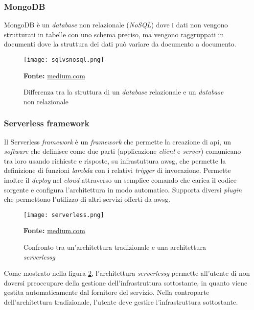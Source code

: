\subsubsection{MongoDB}
MongoDB è un \textit{database} non relazionale (\textit{NoSQL}) dove i dati non vengono strutturati in tabelle con uno schema preciso, ma vengono raggruppati in documenti dove la struttura dei dati può variare da documento a documento.  
\begin{figure}[H]
    \centering
    \texttt{[image: sqlvsnosql.png]}
    \caption{Differenza tra la struttura di un \textit{database} relazionale e un \textit{database} non relazionale}
    \small \textbf{Fonte:} \href{https://naveen-metta.medium.com/decoding-the-database-dilemma-sql-vs-nosql-in-system-design-876e21f4a58c}{medium.com}
    \label{fig:sql-vs-nosql}
\end{figure} 

\subsubsection{Serverless framework}
Il Serverless \textit{framework} è un \textit{framework} che permette la creazione di \gls{api}, un \textit{software} che definisce come due parti (applicazione \textit{client} e \textit{server}) comunicano tra loro usando richieste e risposte, su infrastuttura \gls{awsg}, che permette la definizione di funzioni \textit{lambda} con i relativi \textit{trigger} di invocazione.
Permette inoltre il \textit{deploy} nel \textit{cloud} attraverso un semplice comando che carica il codice sorgente e configura l'architettura in modo automatico. Supporta diversi \textit{plugin} che permettono l'utilizzo di altri servizi offerti da \gls{awsg}.
\begin{figure}[H]
    \centering
    \texttt{[image: serverless.png]}
    \caption{Confronto tra un'architettura tradizionale e una architettura \textit{\gls{serverlessg}}}
    \small \textbf{Fonte:} \href{https://medium.com/canonichq/server-v-s-serverless-architecture-bf3cdab28174}{medium.com}
    \label{fig:Serverless}
\end{figure} 
\noindent
Come mostrato nella figura \ref{fig:Serverless}, l'architettura \textit{\gls{serverlessg}} permette all'utente di non doversi preoccupare della gestione dell'infrastruttura sottostante, in quanto viene gestita automaticamente dal fornitore del servizio. Nella controparte dell'architettura tradizionale, l'utente deve gestire l'infrastruttura sottostante.
